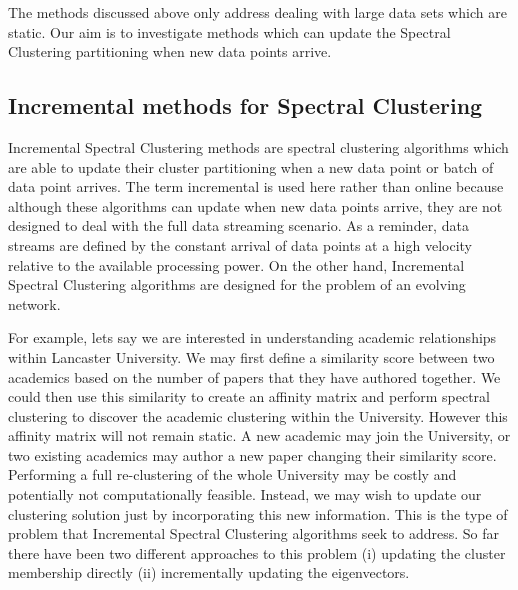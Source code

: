 
The methods discussed above only address dealing with large data sets which are static. Our aim is to investigate methods which can update the Spectral Clustering partitioning when new data points arrive. 

\subsection{Incremental methods for Spectral Clustering}
 \label{sec:incremental}

Incremental Spectral Clustering methods are spectral clustering algorithms which are able to update their cluster partitioning when a new data point or batch of data point arrives. The term incremental is used here rather than online because although these algorithms can update when new data points arrive, they are not designed to deal with the full data streaming scenario. As a reminder, data streams are defined by the constant arrival of data points at a high velocity relative to the available processing power. On the other hand, Incremental Spectral Clustering algorithms are designed for the problem of an evolving network.

For example, lets say we are interested in understanding academic relationships within Lancaster University. We may first define a similarity score between two academics based on the number of papers that they have authored together. We could then use this similarity to create an affinity matrix and perform spectral clustering to discover the academic clustering within the University.  However this affinity matrix will not remain static. A new academic may join the University, or two existing academics may author a new paper changing their similarity score. Performing a full re-clustering of the whole University may be costly and potentially not computationally feasible. Instead, we may wish to update our clustering solution just by incorporating this new information. This is the type of problem that Incremental Spectral Clustering algorithms seek to address.  So far there have been two different approaches to this problem (i) updating the cluster membership directly (ii) incrementally updating the eigenvectors.

